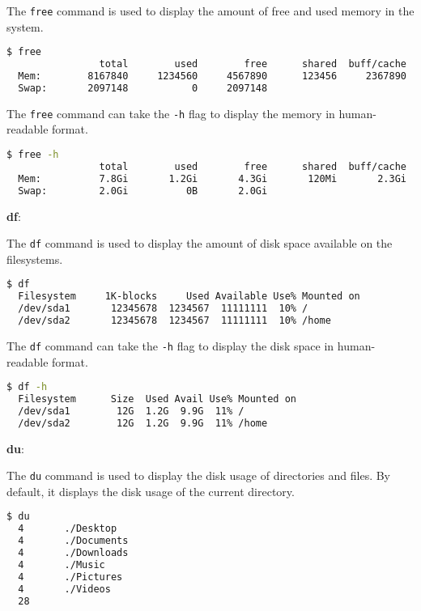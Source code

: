 The \lstinline|free| command is used to display the amount of free and used memory in the system.

\begin{lstlisting}[language=bash]
  $ free
                total        used        free      shared  buff/cache   available
  Mem:        8167840     1234560     4567890      123456     2367890     4567890
  Swap:       2097148           0     2097148
\end{lstlisting}

The \lstinline|free| command can take the \lstinline|-h| flag to display the memory in human-readable format.

\begin{lstlisting}[language=bash]
  $ free -h
                total        used        free      shared  buff/cache   available
  Mem:          7.8Gi       1.2Gi       4.3Gi       120Mi       2.3Gi       4.3Gi
  Swap:         2.0Gi          0B       2.0Gi
\end{lstlisting}

\textbf{df}:

The \lstinline|df| command is used to display the amount of disk space available on the filesystems.

\begin{lstlisting}[language=bash]
  $ df
  Filesystem     1K-blocks     Used Available Use% Mounted on
  /dev/sda1       12345678  1234567  11111111  10% /
  /dev/sda2       12345678  1234567  11111111  10% /home
\end{lstlisting}

The \lstinline|df| command can take the \lstinline|-h| flag to display the disk space in human-readable format.

\begin{lstlisting}[language=bash]
  $ df -h
  Filesystem      Size  Used Avail Use% Mounted on
  /dev/sda1        12G  1.2G  9.9G  11% /
  /dev/sda2        12G  1.2G  9.9G  11% /home
\end{lstlisting}

\textbf{du}:

The \lstinline|du| command is used to display the disk usage of directories and files.
By default, it displays the disk usage of the current directory.

\begin{lstlisting}[language=bash]
  $ du
  4       ./Desktop
  4       ./Documents
  4       ./Downloads
  4       ./Music
  4       ./Pictures
  4       ./Videos
  28
\end{lstlisting}

